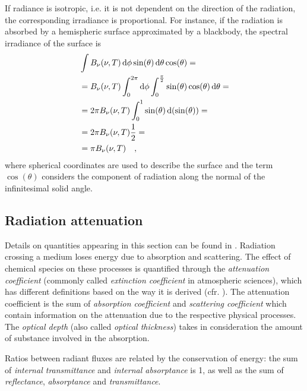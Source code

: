 \documentclass[a4paper,10pt,twocolumn,\classoptions]{article}
\begin{document}
If radiance is isotropic, i.e. it is not dependent on the direction of the radiation, the corresponding irradiance is proportional. For instance, if the radiation is absorbed by a hemispheric surface approximated by a blackbody, the spectral irradiance of the surface is
\begin{equation}
  \label{eq:spectral_irradiance_blackbody_hemisphere}
  \begin{split}
    & \int B_\nu (\nu, T) \odif{\phi} \sin(\theta) \odif{\theta} \cos(\theta) = \\
    & = B_\nu (\nu, T) \int_0^{2\pi} \odif{\phi} \int_0^\frac{\pi}{2} \sin(\theta) \cos(\theta) \odif{\theta} = \\
    & = 2 \pi B_\nu (\nu, T) \int_0^1 \sin(\theta) \odif{(\sin(\theta))} = \\
    & = 2 \pi B_\nu (\nu, T) \frac{1}{2} = \\
    & = \pi B_\nu (\nu, T)
    \quad ,
  \end{split}
\end{equation}
where spherical coordinates are used to describe the surface and the term $\cos(\theta)$ considers the component of radiation along the normal of the infinitesimal solid angle.



\subsection{Radiation attenuation}
\label{sec:Radiation attenuation}
Details on quantities appearing in this section can be found in \cite[285]{Modest}.
Radiation crossing a medium loses energy due to absorption and scattering. The effect of chemical species on these processes is quantified through the \emph{attenuation coefficient} (commonly called \emph{extinction coefficient} in atmospheric sciences), which has different definitions based on the way it is derived (cfr. \cite[44]{Catling}). The attenuation coefficient is the sum of \emph{absorption coefficient} and \emph{scattering coefficient} which contain information on the attenuation due to the respective physical processes. The \emph{optical depth} (also called \emph{optical thickness}) takes in consideration the amount of substance involved in the absorption.

Ratios between radiant fluxes are related by the conservation of energy: the sum of \emph{internal transmittance} and \emph{internal absorptance} is 1, as well as the sum of \emph{reflectance}, \emph{absorptance} and \emph{transmittance}.
\end{document}
